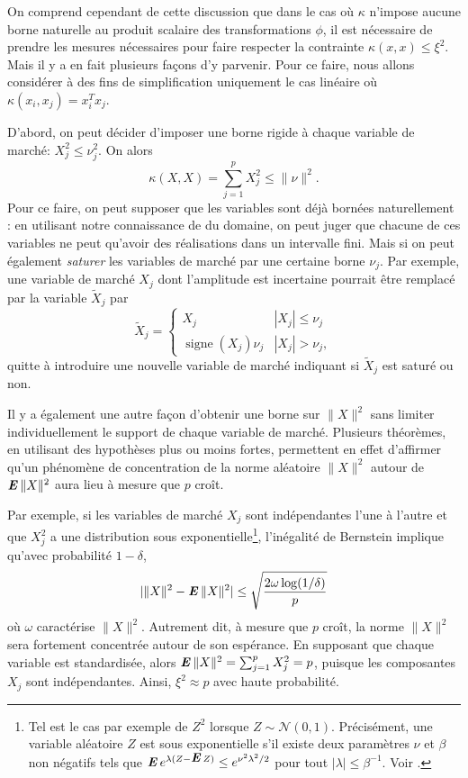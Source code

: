 On comprend cependant de cette discussion que dans le cas où $\kappa$ n'impose aucune borne
naturelle au produit scalaire des transformations $\phi$, il est nécessaire de prendre les
mesures nécessaires pour faire respecter la contrainte $\kappa(x,x)\leq\xi^2$. Mais il y a en fait
plusieurs façons d'y parvenir. Pour ce faire, nous allons considérer à
des fins de simplification uniquement le cas linéaire où $\kappa(x_i,x_j) = x_i^Tx_j$.

D'abord, on peut décider d'imposer une borne rigide à chaque variable de marché: $X_j^2 \leq
\nu_j^2$. On alors 
\begin{equation}
  \kappa(X,X) = \sum_{j=1}^p X_j^2 \leq \|\nu\|^2.
\end{equation}
Pour ce faire, on peut supposer que les variables sont déjà bornées naturellement : en
utilisant notre connaissance de du domaine, on peut juger que chacune de ces variables ne
peut qu'avoir des réalisations dans un intervalle fini. Mais si on peut également
\textit{saturer} les variables de marché par une certaine borne $\nu_j$. Par exemple, une
variable de marché $X_j$ dont l'amplitude est incertaine pourrait être remplacé par la
variable $\tilde X_j$ par 
\begin{equation}
  \tilde X_j = \begin{cases}
    X_j & |X_j| \leq \nu_j\\
     \operatorname{signe}(X_j)\nu_j & |X_j| > \nu_j,
  \end{cases}
\end{equation}
quitte à introduire une nouvelle variable de marché indiquant si $\tilde X_j$ est saturé
ou non.

Il y a également une autre façon d'obtenir une borne sur $\|X\|^2$ sans limiter
individuellement le support de chaque variable de marché. Plusieurs théorèmes, en
utilisant des hypothèses plus ou moins fortes, permettent en effet d'affirmer qu'un
phénomène de concentration de la norme aléatoire $\|X\|^2$ autour de $\operatorname{\mbox{\textbf{\textit{E}}}}\|X\|^2$ aura lieu
à mesure que $p$ croît.

Par exemple, si les variables de marché $X_j$ sont indépendantes l'une à l'autre et que
$X_j^2$ a une distribution sous exponentielle\footnote{Tel est le cas par exemple de $Z^2$
  lorsque $Z \sim \mathscr{N}(0,1)$. Précisément, une variable aléatoire $Z$ est sous
  exponentielle s'il existe deux paramètres $\nu$ et $\beta$ non négatifs tels que
  $\operatorname{\mbox{\textbf{\textit{E}}}} e^{\lambda(Z-\operatorname{\mbox{\textbf{\textit{E}}}} Z)} \leq e^{\nu^2\lambda^2/2}$ pour tout
  $|\lambda| \leq \beta^{-1}$. Voir \cite{boucheron2013concentration}.}, l'inégalité de Bernstein
implique qu'avec probabilité $1-\delta$,
\begin{equation}
  |\|X\|^2 - \operatorname{\mbox{\textbf{\textit{E}}}}\|X\|^2| \leq \sqrt\frac{2\omega\log(1/\delta)}{p}
\end{equation}
où $\omega$ caractérise $\|X\|^2$.  Autrement dit, à mesure que $p$ croît, la norme
$\|X\|^2$ sera fortement concentrée autour de son espérance. En supposant que chaque
variable est standardisée, alors $\operatorname{\mbox{\textbf{\textit{E}}}}\|X\|^2 = \sum_{j=1}^pX_j^2 = p$, puisque les composantes
$X_j$ sont indépendantes. Ainsi, $\xi^2 \approx p$ avec haute probabilité.

